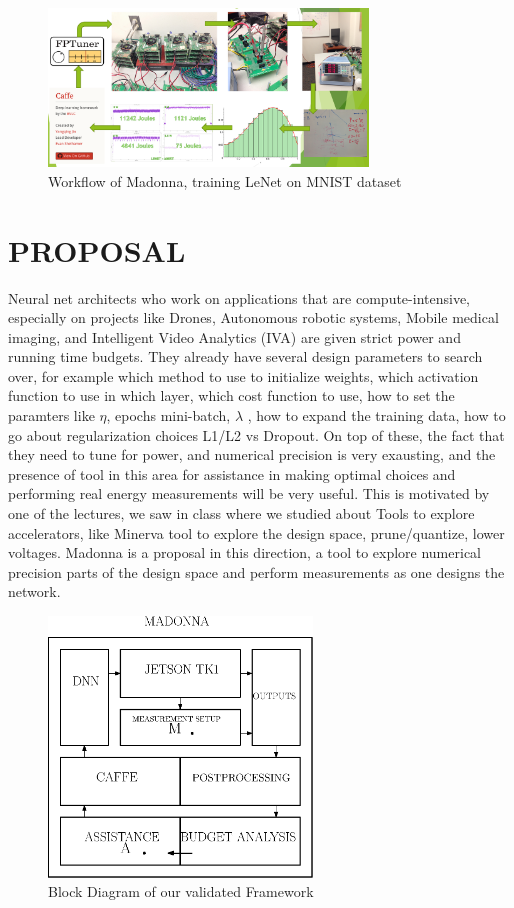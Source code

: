 \documentclass[letterpaper, 10 pt, conference]{ieeeconf}
\begin{document}
          \begin{figure}[h]
              \centering
              \includegraphics[width=85mm,scale=1]{wf}
              \caption{Workflow of Madonna, training LeNet on MNIST dataset}
              \label{q1}
          \end{figure}



\section{PROPOSAL}
         
Neural net architects who work on applications that are compute-intensive, especially on projects like Drones, Autonomous robotic systems, Mobile medical imaging, and Intelligent Video Analytics (IVA) are given strict power and running time budgets. They already have several design parameters to search over, for example which method to use to initialize weights, which activation function to use in which layer, which cost function to use, how to set the paramters like $\eta$, epochs mini-batch, $\lambda$ , how to expand the training data, how to go about regularization choices L1/L2 vs Dropout. 
On top of these, the fact that they need to tune for power, and numerical precision is very exausting, and the presence of tool in this area for assistance in making optimal choices and performing real energy measurements will be very useful. This is motivated by one of the lectures, we saw in class where we studied about Tools to explore accelerators, like Minerva tool to explore the design space, prune/quantize, lower voltages.
Madonna is a proposal in this direction, a tool to explore numerical precision parts of the design space and perform measurements as one designs the network.

\begin{figure}[h]
  \centering
  \includegraphics[width=70mm,scale=1]{frame}
  \caption{Block Diagram of our validated Framework}
  \label{fig:frame}
\end{figure}
\end{document}
